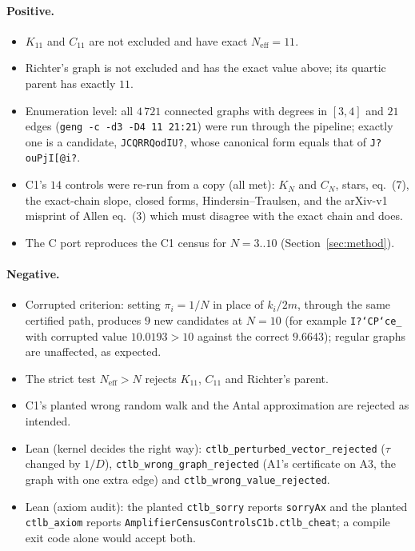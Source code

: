 \documentclass[10pt]{article}
\newcommand{\lean}[1]{\texttt{#1}}
\newcommand{\Neff}{N_{\mathrm{eff}}}
\begin{document}
\paragraph{Positive.}
\begin{itemize}\itemsep=0pt
\item $K_{11}$ and $C_{11}$ are not excluded and have exact $\Neff=11$.
\item Richter's graph is not excluded and has the exact value above; its quartic parent has exactly $11$.
\item Enumeration level: all $4\,721$ connected graphs with degrees in $[3,4]$ and $21$ edges (\texttt{geng -c -d3 -D4 11 21:21}) were run through the pipeline; exactly one is a candidate, \texttt{JCQRRQodIU?}, whose canonical form equals that of \texttt{J?ouPjI[@i?}.
\item C1's $14$ controls were re-run from a copy (all met): $K_N$ and $C_N$, stars, eq.~(7), the exact-chain slope, closed forms, Hindersin--Traulsen, and the arXiv-v1 misprint of Allen eq.~(3) which must disagree with the exact chain and does.
\item The C port reproduces the C1 census for $N=3..10$ (Section~\ref{sec:method}).
\end{itemize}
\paragraph{Negative.}
\begin{itemize}\itemsep=0pt
\item Corrupted criterion: setting $\pi_i=1/N$ in place of $k_i/2m$, through the same certified path, produces $9$ new candidates at $N=10$ (for example \texttt{I?`CP`ce\_} with corrupted value $10.0193>10$ against the correct $9.6643$); regular graphs are unaffected, as expected.
\item The strict test $\Neff>N$ rejects $K_{11}$, $C_{11}$ and Richter's parent.
\item C1's planted wrong random walk and the Antal approximation are rejected as intended.
\item Lean (kernel decides the right way): \lean{ctlb\_perturbed\_vector\_rejected} ($\tau$ changed by $1/D$), \lean{ctlb\_wrong\_graph\_rejected} (A1's certificate on A3, the graph with one extra edge) and \lean{ctlb\_wrong\_value\_rejected}.
\item Lean (axiom audit): the planted \lean{ctlb\_sorry} reports \lean{sorryAx} and the planted \lean{ctlb\_axiom} reports \lean{AmplifierCensusControlsC1b.ctlb\_cheat}; a compile exit code alone would accept both.
\end{itemize}
\end{document}
